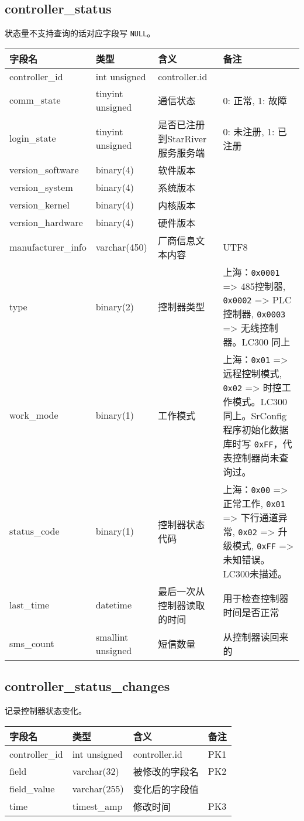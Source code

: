 \subsection{controller\_status}\label{controllerux5fstatus}

状态量不支持查询的话对应字段写 \texttt{NULL}。

\begin{longtabu}[c]{@{}lXXX@{}}
\toprule
字段名 & 类型 & 含义 & 备注\tabularnewline
\midrule
\endhead
controller\_id & int unsigned & controller.id &\tabularnewline
comm\_state & tinyint unsigned & 通信状态 & 0: 正常, 1:
故障\tabularnewline
login\_state & tinyint unsigned & 是否已注册到StarRiver服务服务端 & 0:
未注册, 1: 已注册\tabularnewline
version\_software & binary(4) & 软件版本 &\tabularnewline
version\_system & binary(4) & 系统版本 &\tabularnewline
version\_kernel & binary(4) & 内核版本 &\tabularnewline
version\_hardware & binary(4) & 硬件版本 &\tabularnewline
manufacturer\_info & varchar(450) & 厂商信息文本内容 &
UTF8\tabularnewline
type & binary(2) & 控制器类型 & 上海：\texttt{0x0001} =\textgreater{}
485控制器, \texttt{0x0002} =\textgreater{} PLC控制器, \texttt{0x0003}
=\textgreater{} 无线控制器。LC300 同上\tabularnewline
work\_mode & binary(1) & 工作模式 & 上海：\texttt{0x01} =\textgreater{}
远程控制模式, \texttt{0x02} =\textgreater{}
时控工作模式。LC300同上。SrConfig程序初始化数据库时写
\texttt{0xFF}，代表控制器尚未查询过。\tabularnewline
status\_code & binary(1) & 控制器状态代码 & 上海：\texttt{0x00}
=\textgreater{} 正常工作, \texttt{0x01} =\textgreater{} 下行通道异常,
\texttt{0x02} =\textgreater{} 升级模式, \texttt{0xFF} =\textgreater{}
未知错误。LC300未描述。\tabularnewline
last\_time & datetime & 最后一次从控制器读取的时间 &
用于检查控制器时间是否正常\tabularnewline
sms\_count & smallint unsigned & 短信数量 &
从控制器读回来的\tabularnewline
\bottomrule
\end{longtabu}

\subsection{controller\_status\_changes}\label{controllerux5fstatusux5fchanges}

记录控制器状态变化。

\begin{longtabu}[c]{@{}lXXX@{}}
\toprule
字段名 & 类型 & 含义 & 备注\tabularnewline
\midrule
\endhead
controller\_id & int unsigned & controller.id & PK1\tabularnewline
field & varchar(32) & 被修改的字段名 & PK2\tabularnewline
field\_value & varchar(255) & 变化后的字段值\tabularnewline
time & timest\_amp & 修改时间 & PK3\tabularnewline
\bottomrule
\end{longtabu}

